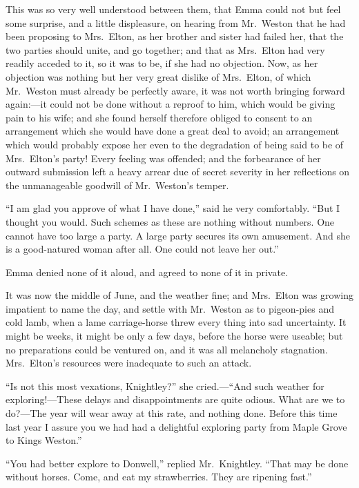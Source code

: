 This was so very well understood between them, that Emma could
not but feel some surprise, and a little displeasure, on hearing
from Mr.\ Weston that he had been proposing to Mrs.\ Elton, as her
brother and sister had failed her, that the two parties should unite,
and go together; and that as Mrs.\ Elton had very readily acceded
to it, so it was to be, if she had no objection.  Now, as her
objection was nothing but her very great dislike of Mrs.\ Elton,
of which Mr.\ Weston must already be perfectly aware, it was not worth
bringing forward again:---it could not be done without a reproof
to him, which would be giving pain to his wife; and she found
herself therefore obliged to consent to an arrangement which she
would have done a great deal to avoid; an arrangement which would
probably expose her even to the degradation of being said to be of
Mrs.\ Elton's party!  Every feeling was offended; and the forbearance
of her outward submission left a heavy arrear due of secret severity
in her reflections on the unmanageable goodwill of Mr.\ Weston's temper.

``I am glad you approve of what I have done,'' said he very comfortably.
``But I thought you would.  Such schemes as these are nothing
without numbers.  One cannot have too large a party.  A large party
secures its own amusement.  And she is a good-natured woman after all.
One could not leave her out.''

Emma denied none of it aloud, and agreed to none of it in private.

It was now the middle of June, and the weather fine; and Mrs.\ Elton
was growing impatient to name the day, and settle with Mr.\ Weston
as to pigeon-pies and cold lamb, when a lame carriage-horse threw
every thing into sad uncertainty.  It might be weeks, it might be
only a few days, before the horse were useable; but no preparations
could be ventured on, and it was all melancholy stagnation.
Mrs.\ Elton's resources were inadequate to such an attack.

``Is not this most vexations, Knightley?'' she cried.---``And such weather
for exploring!---These delays and disappointments are quite odious.
What are we to do?---The year will wear away at this rate,
and nothing done.  Before this time last year I assure you we had
had a delightful exploring party from Maple Grove to Kings Weston.''

``You had better explore to Donwell,'' replied Mr.\ Knightley.
``That may be done without horses.  Come, and eat my strawberries.
They are ripening fast.''

